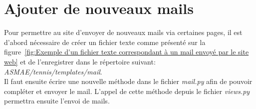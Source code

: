 \section{Ajouter de nouveaux mails}

Pour permettre au site d'envoyer de nouveaux mails via certaines pages, il est d'abord nécessaire de créer un fichier texte comme présenté sur la figure~\ref{fig:Exemple d'un fichier texte correspondant à un mail envoyé par le site web} et de l'enregistrer dans le répertoire suivant: \textit{ASMAE/tennis/templates/mail}.\\

Il faut ensuite écrire une nouvelle méthode dans le fichier \textit{mail.py} afin de pouvoir compléter et envoyer le mail. L'appel de cette méthode depuis le fichier \textit{views.py} permettra ensuite l'envoi de mails.
